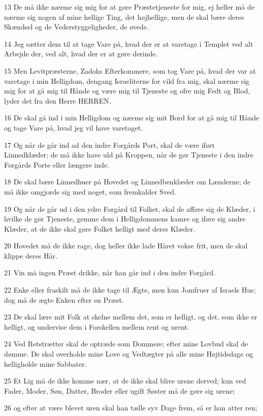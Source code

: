 \par 13 De må ikke nærme sig mig for at gøre Præstetjeneste for mig, ej heller må de nærme sig nogen af mine hellige Ting, det højhellige, men de skal bære deres Skændsel og de Vederstyggeligheder, de øvede.
\par 14 Jeg sætter dem til at tage Vare på, hvad der er at varetage i Templet ved alt Arbejde der, ved alt, hvad der er at gøre derinde.
\par 15 Men Levitpræsterne, Zadoks Efterkommere, som tog Vare på, hvad der var at varetage i min Helligdom, dengang Israeliterne for vild fra mig, skal nærme sig mig for at gå mig til Hånde og være mig til Tjeneste og ofre mig Fedt og Blod, lyder det fra den Herre HERREN.
\par 16 De skal gå ind i min Helligdom og nærme sig mit Bord for at gå mig til Hånde og tage Vare på, hvad jeg vil have varetaget.
\par 17 Og når de går ind ad den indre Forgårds Port, skal de være iført Linnedklæder; de må ikke have uld på Kroppen, når de gør Tjeneste i den indre Forgårds Porte eller længere inde.
\par 18 De skal bære Linnedhuer på Hovedet og Linnedbenklæder om Lænderne; de må ikke omgjorde sig med noget, som fremkalder Sved.
\par 19 Og når de går ud i den ydre Forgård til Folket, skal de afføre sig de Klæder, i hvilke de gør Tjeneste, gemme dem i Helligdommens kamre og iføre sig andre Klæder, at de ikke skal gøre Folket helligt med deres Klæder.
\par 20 Hovedet må de ikke rage, dog heller ikke lade Håret vokse frit, men de skal klippe deres Hår.
\par 21 Vin må ingen Præst drikke, når han går ind i den indre Forgård.
\par 22 Enke eller fraskilt må de ikke tage til Ægte, men kun Jomfruer af Israels Hus; dog må de ægte Enken efter en Præst.
\par 23 De skal lære mit Folk at skelne mellem det, som er helligt, og det, som ikke er helligt, og undervise dem i Forskellen mellem rent og urent.
\par 24 Ved Retstrætter skal de optræde som Dommere; efter mine Lovbud skal de dømme. De skal overholde mine Love og Vedtægter på alle mine Højtidsdage og helligholde mine Sabbater.
\par 25 Et Lig må de ikke komme nær, at de ikke skal blive urene derved; kun ved Fader, Moder, Søn, Datter, Broder eller ugift Søster må de gøre sig urene;
\par 26 og efter at være blevet uren skal han tælle syv Dage frem, så er han atter ren;
